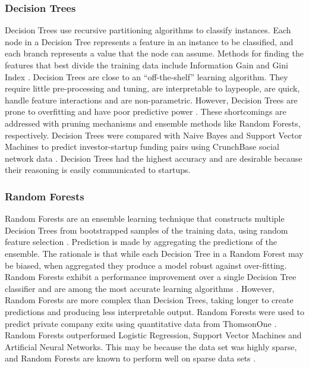 \documentclass[../thesis/thesis.tex]{subfiles}
\begin{document}
\subsubsection{Decision Trees}

Decision Trees use recursive partitioning algorithms to classify instances. Each node in a Decision Tree represents a feature in an instance to be classified, and each branch represents a value that the node can assume. Methods for finding the features that best divide the training data include Information Gain and Gini Index \cite{kotsiantis2007}. Decision Trees are close to an ``off-the-shelf'' learning algorithm. They require little pre-processing and tuning, are interpretable to laypeople, are quick, handle feature interactions and are non-parametric. However, Decision Trees are prone to overfitting and have poor predictive power \cite{caruana2006}. These shortcomings are addressed with pruning mechanisms and ensemble methods like Random Forests, respectively. Decision Trees were compared with Naive Bayes and Support Vector Machines to predict investor-startup funding pairs using CrunchBase social network data \cite{liang2016}. Decision Trees had the highest accuracy and are desirable because their reasoning is easily communicated to startups.

\subsubsection{Random Forests}

Random Forests are an ensemble learning technique that constructs multiple Decision Trees from bootstrapped samples of the training data, using random feature selection \cite{breiman2001}. Prediction is made by aggregating the predictions of the ensemble. The rationale is that while each Decision Tree in a Random Forest may be biased, when aggregated they produce a model robust against over-fitting.  Random Forests exhibit a performance improvement over a single Decision Tree classifier and are among the most accurate learning algorithms \cite{caruana2006}.  However, Random Forests are more complex than Decision Trees, taking longer to create predictions and producing less interpretable output. Random Forests were used to predict private company exits using quantitative data from ThomsonOne \cite{bhat2011}. Random Forests outperformed Logistic Regression, Support Vector Machines and Artificial Neural Networks. This may be because the data set was highly sparse, and Random Forests are known to perform well on sparse data sets \cite{breiman2001}.
\end{document}
